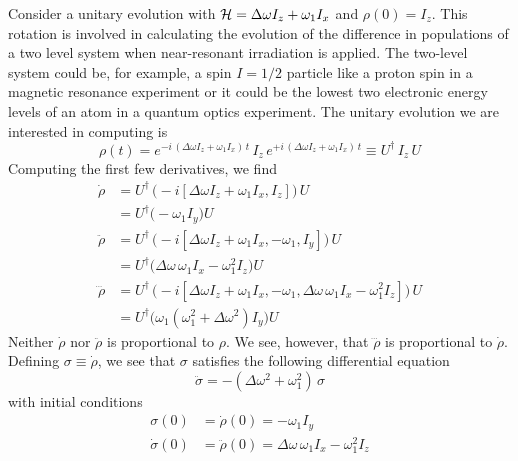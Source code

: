  Consider a unitary evolution with ${\cal H} = \Delta \omega I_z + \omega_1 I_x$ and $\rho(0) = I_z$.  This rotation is involved in calculating the evolution of the difference in populations of a two level system when near-resonant irradiation is applied.  The two-level system could be, for example, a spin $I = 1/2$ particle like a proton spin in a magnetic resonance experiment or it could be the lowest two electronic energy levels of an atom in a quantum optics experiment.  The unitary evolution we are interested in computing is
\begin{equation}
\rho(t)
	= e^{-i \, (\Delta \omega I_z + \omega_1 I_x) \, t}
	  \, I_z \,
	 e^{+i \, (\Delta \omega I_z + \omega_1 I_x) \, t}
	\equiv U^{\dagger} \, I_{z} \, U
	\label{Eq:Example4}  
\end{equation}
Computing the first few derivatives, we find
\begin{subequations}
\begin{align}
\dot{\rho} & = U^{\dagger} \, 
	\big( 
		-i [\Delta \omega I_z + \omega_1 I_x, I_z]
	\big) \, U \\
	& = U^{\dagger} \big( 
		-\omega_1 I_y 
	\big) U \\
\ddot{\rho} & = U^{\dagger} \, 
	\big(  
		-i [\Delta \omega I_z + \omega_1 I_x, -\omega_1, I_y]
	\big) \, U \\
	& = U^{\dagger} \big( 
		\Delta \omega \, \omega_1 I_x - \omega_1^2 I_z 
	\big) U \\
\dddot{\rho} & = U^{\dagger} \, 
	\big(  
		-i [\Delta \omega I_z + \omega_1 I_x, -\omega_1, 
				\Delta \omega \, \omega_1 I_x - \omega_1^2 I_z]
	\big) \, U \\
	& = U^{\dagger} \big( 
		\omega_1 \left( 
			\omega_1^2 + \Delta \omega^2
		\right) I_y
	\big) U
\end{align}
\end{subequations} 
Neither $\dot{\rho}$ nor $\ddot{\rho}$ is proportional to $\rho$.    We see, however, that $\dddot{\rho}$ is proportional to $\dot{\rho}$.  Defining $\sigma \equiv \dot{\rho}$, we see that $\sigma$ satisfies the following differential equation
\begin{equation}
\ddot{\sigma} 
	= - (\Delta \omega^2 + \omega_1^2) \, \sigma
	\label{Eq:Example4-ODE}
\end{equation}
with initial conditions
\begin{subequations}
\begin{align}
\sigma(0) 
	& = \dot{\rho}(0) 
	  = - \omega_1 I_y \\
\dot{\sigma}(0) 
	& = \ddot{\rho}(0)
	  = \Delta \omega \, \omega_1 I_x - \omega_1^2 I_z 
\end{align}
\end{subequations}
